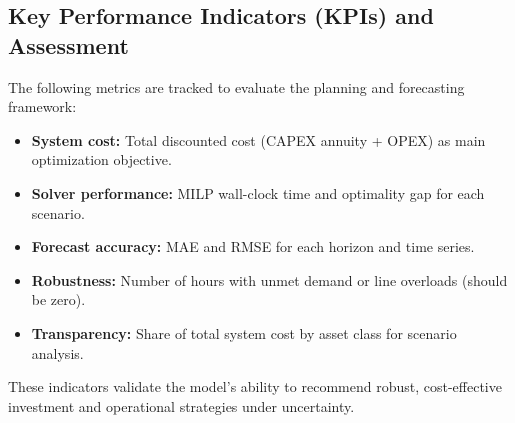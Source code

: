 \subsection{Key Performance Indicators (KPIs) and Assessment}
The following metrics are tracked to evaluate the planning and forecasting framework:
\begin{itemize}
    \item \textbf{System cost:} Total discounted cost (CAPEX annuity + OPEX) as main optimization objective.
    \item \textbf{Solver performance:} MILP wall-clock time and optimality gap for each scenario.
    \item \textbf{Forecast accuracy:} MAE and RMSE for each horizon and time series.
    \item \textbf{Robustness:} Number of hours with unmet demand or line overloads (should be zero).
    \item \textbf{Transparency:} Share of total system cost by asset class for scenario analysis.
\end{itemize}
These indicators validate the model’s ability to recommend robust, cost-effective investment and operational strategies under uncertainty.
